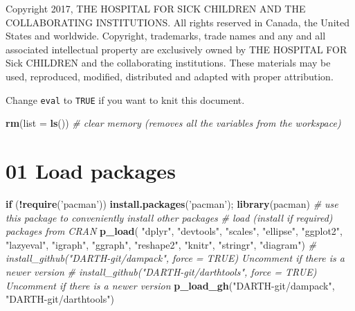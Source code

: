 \documentclass[
]{article}
\newenvironment{Shaded}{\begin{snugshade}}{\end{snugshade}}
\newcommand{\CommentTok}[1]{\textcolor[rgb]{0.56,0.35,0.01}{\textit{#1}}}
\newcommand{\ControlFlowTok}[1]{\textcolor[rgb]{0.13,0.29,0.53}{\textbf{#1}}}
\newcommand{\DataTypeTok}[1]{\textcolor[rgb]{0.13,0.29,0.53}{#1}}
\newcommand{\KeywordTok}[1]{\textcolor[rgb]{0.13,0.29,0.53}{\textbf{#1}}}
\newcommand{\NormalTok}[1]{#1}
\newcommand{\OperatorTok}[1]{\textcolor[rgb]{0.81,0.36,0.00}{\textbf{#1}}}
\newcommand{\StringTok}[1]{\textcolor[rgb]{0.31,0.60,0.02}{#1}}
\begin{document}
Copyright 2017, THE HOSPITAL FOR SICK CHILDREN AND THE COLLABORATING
INSTITUTIONS. All rights reserved in Canada, the United States and
worldwide. Copyright, trademarks, trade names and any and all associated
intellectual property are exclusively owned by THE HOSPITAL FOR Sick
CHILDREN and the collaborating institutions. These materials may be
used, reproduced, modified, distributed and adapted with proper
attribution.

\newpage

Change \texttt{eval} to \texttt{TRUE} if you want to knit this document.

\begin{Shaded}
\begin{Highlighting}[]
\KeywordTok{rm}\NormalTok{(}\DataTypeTok{list =} \KeywordTok{ls}\NormalTok{())      }\CommentTok{# clear memory (removes all the variables from the workspace)}
\end{Highlighting}
\end{Shaded}

\hypertarget{load-packages}{%
\section{01 Load packages}\label{load-packages}}

\begin{Shaded}
\begin{Highlighting}[]
\ControlFlowTok{if}\NormalTok{ (}\OperatorTok{!}\KeywordTok{require}\NormalTok{(}\StringTok{'pacman'}\NormalTok{)) }\KeywordTok{install.packages}\NormalTok{(}\StringTok{'pacman'}\NormalTok{); }\KeywordTok{library}\NormalTok{(pacman) }\CommentTok{# use this package to conveniently install other packages}
\CommentTok{# load (install if required) packages from CRAN}
\KeywordTok{p_load}\NormalTok{( }\StringTok{"dplyr"}\NormalTok{, }\StringTok{"devtools"}\NormalTok{, }\StringTok{"scales"}\NormalTok{, }\StringTok{"ellipse"}\NormalTok{, }\StringTok{"ggplot2"}\NormalTok{, }\StringTok{"lazyeval"}\NormalTok{, }\StringTok{"igraph"}\NormalTok{, }\StringTok{"ggraph"}\NormalTok{, }\StringTok{"reshape2"}\NormalTok{, }\StringTok{"knitr"}\NormalTok{, }\StringTok{"stringr"}\NormalTok{, }\StringTok{"diagram"}\NormalTok{)   }
\CommentTok{# install_github("DARTH-git/dampack", force = TRUE) Uncomment if there is a newer version}
\CommentTok{# install_github("DARTH-git/darthtools", force = TRUE) Uncomment if there is a newer version}
\KeywordTok{p_load_gh}\NormalTok{(}\StringTok{"DARTH-git/dampack"}\NormalTok{, }\StringTok{"DARTH-git/darthtools"}\NormalTok{)}
\end{Highlighting}
\end{Shaded}
\end{document}
